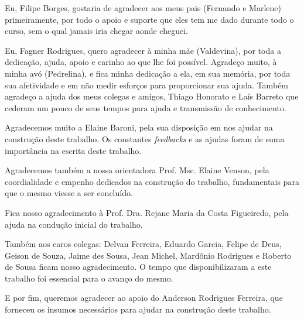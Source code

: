 \begin{agradecimentos}
\begin{comment}
A inclusão desta seção de agradecimentos é opcional, portanto, sua inclusão 
fica a critério do(s) autor(es), que caso deseje(em) fazê-lo deverá(ão) 
utilizar este espaço, seguindo a formatação de \textit{espaço simples e 
fonte padrão do texto (arial ou times, tamanho 12 sem negritos, aspas ou 
itálico}.
\end{comment}

Eu, Filipe Borges, gostaria de agradecer aos meus pais (Fernando e Marlene) primeiramente, por todo o apoio e suporte que eles tem me dado durante todo o curso, sem o qual jamais iria chegar aonde cheguei.

Eu, Fagner Rodrigues, quero agradecer à minha mãe (Valdevina), por toda a dedicação, ajuda, apoio e carinho ao que lhe foi possível. Agradeço muito, à minha avó (Pedrelina), e fica minha dedicação a ela, em sua memória, por toda sua afetividade e em não medir esforços para proporcionar sua ajuda. Também agradeço a ajuda dos meus colegas e amigos, Thiago Honorato e Laís Barreto que cederam um pouco de seus tempos para ajuda e transmissão de conhecimento.

Agradecemos muito a Elaine Baroni, pela sua disposição em nos ajudar na construção deste trabalho. Os constantes \textit{feedbacks} e as ajudas foram de suma importância na escrita deste trabalho.

Agradecemos também a nossa orientadora Prof. Msc. Elaine Venson, pela coordialidade e empenho dedicados na construção do trabalho, fundamentais para que o mesmo viesse a ser concluído.

Fica nosso agradecimento à Prof. Dra. Rejane Maria da Costa Figueiredo, pela ajuda na condução inicial do trabalho.

Também aos caros colegas: Delvan Ferreira, Eduardo Garcia, Felipe de Deus, Geison de Souza, Jaime des Sousa, Jean Michel, Mardônio Rodrigues e Roberto de Sousa ficam nosso agradecimento. O tempo que disponibilizaram a este trabalho foi essencial para o avanço do mesmo.

E por fim, queremos agradecer ao apoio do Anderson Rodrigues Ferreira, que forneceu os insumos necessários para ajudar na construção deste trabalho.

\end{agradecimentos}
